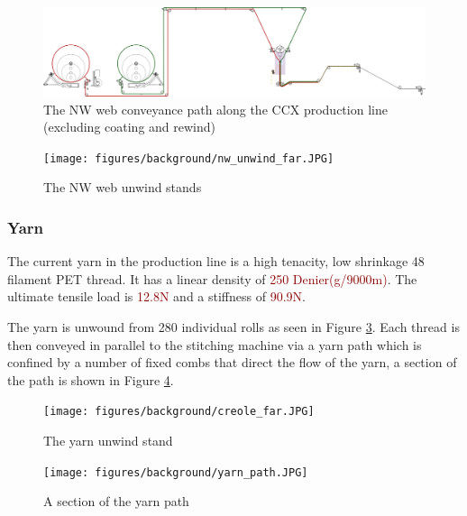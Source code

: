 \documentclass[12pt]{report}
\newcommand{\tcr}[1]{\textcolor{darkRed}{#1}}
\begin{document}
\begin{figure}[ht]
    \centering
    \includegraphics[width=\textwidth]{figures/background/CX02 V03 side drawing.pdf}
    \caption{The NW web conveyance path along the CCX production line (excluding coating and rewind)}
    \label{fig:web_path_solid}
\end{figure}

\begin{figure}[ht]
    \centering
    \texttt{[image: figures/background/nw\_unwind\_far.JPG]}
    \caption{The NW web unwind stands}
    \label{fig:nw_unwind}
\end{figure}
    

        \subsubsection{Yarn}
        The current yarn in the production line is a high tenacity, low shrinkage 48 filament PET thread. It has a linear density of \tcr{250 Denier(g/9000m)}. The ultimate tensile load is \tcr{12.8N} and a stiffness of \tcr{90.9N}.
        
        The yarn is unwound from 280 individual rolls as seen in Figure \ref{fig:yarn_unwind}. Each thread is then conveyed in parallel to the stitching machine via a yarn path which is confined by a number of fixed combs that direct the flow of the yarn, a section of the path is shown in Figure \ref{fig:yarn_path}.
        
\begin{figure}
    \centering
    \texttt{[image: figures/background/creole\_far.JPG]}
    \caption{The yarn unwind stand}
    \label{fig:yarn_unwind}
\end{figure}
\begin{figure}
    \centering
    \texttt{[image: figures/background/yarn\_path.JPG]}
    \caption{A section of the yarn path}
    \label{fig:yarn_path}
\end{figure}
\end{document}

